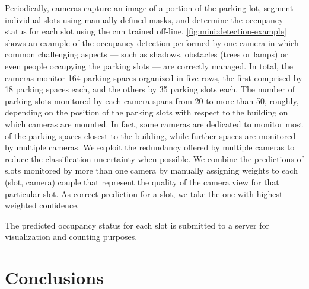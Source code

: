 Periodically, cameras capture an image of a portion of the parking lot, segment individual slots using manually defined masks, and determine the occupancy status for each slot using the \gls{cnn} trained off-line.
\ref{fig:mini:detection-example} shows an example of the occupancy detection performed by one camera in which common challenging aspects --- such as shadows, obstacles (trees or lamps) or even people occupying the parking slots --- are correctly managed.
In total, the cameras monitor 164 parking spaces organized in five rows, the first comprised by 18 parking spaces each, and the others by 35 parking slots each.
The number of parking slots monitored by each camera spans from 20 to more than 50, roughly, depending on the position of the parking slots with respect to the building on which cameras are mounted.
In fact, some cameras are dedicated to monitor most of the parking spaces closest to the building, while further spaces are monitored by multiple cameras.
We exploit the redundancy offered by multiple cameras to reduce the classification uncertainty when possible.
We combine the predictions of slots monitored by more than one camera by manually assigning weights to each (slot, camera) couple that represent the quality of the camera view for that particular slot.
As correct prediction for a slot, we take the one with highest weighted confidence.

The predicted occupancy status for each slot is submitted to a server for visualization and counting purposes.


\section{Conclusions}
\label{sec:mini:conclusions}

